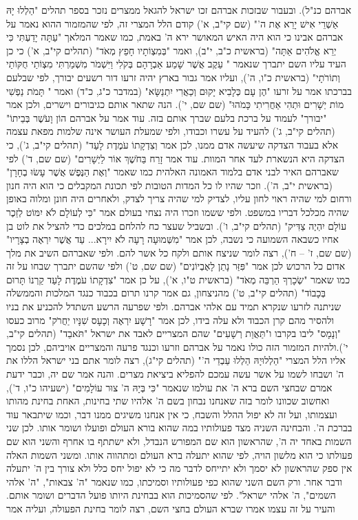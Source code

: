 \documentclass[12pt, openany]{book}
\begin{document}
אברהם כנ"ל). ובעבור שבזכות אברהם זכו ישראל להגאל ממצרים נזכר בספר תהלים "הַלְלוּ יָהּ אַשְׁרֵי אִישׁ יָרֵא אֶת ה'" (שם קי"ב, א') קודם הלל המצרי זה, לפי שהמזמור ההוא נאמר על אברהם אבינו כי הוא היה האיש המאושר ירא ה' באמת, כמו שאמר המלאך "עַתָּה יָדַעְתִּי כִּי יְרֵא אֱלֹהִים אַתָּה" (בראשית כ"ב, י"ב), ואמר "בְּמִצְו‍ֹתָיו חָפֵץ מְאֹד" (תהלים קי"ב, א') כי כן העיד עליו השם יתברך שנאמר " עֵקֶב אֲשֶׁר שָׁמַע אַבְרָהָם בְּקֹלִי וַיִּשְׁמֹר מִשְׁמַרְתִּי מִצְו‍ֹתַי חֻקּוֹתַי וְתוֹרֹתָי" (בראשית כ"ו, ה'), ועליו אמר גבור בארץ יהיה זרעו דור רשעים יבורך, לפי שבלעם בברכתו אמר על זרעו "הֶן עָם כְּלָבִיא יָקוּם וְכַאֲרִי יִתְנַשָּׂא" (במדבר כ"ג, כ"ד) ואמר " תָּמֹת נַפְשִׁי מוֹת יְשָׁרִים וּתְהִי אַחֲרִיתִי כָּמֹהוּ" (שם שם, י'). הנה שתאר אותם כגיבורים וישרים, ולכן אמר "יבורך" לעמוד על ברכת בלעם שברך אותם בזה. עוד אמר על אברהם  הוֹן וָעֹשֶׁר בְּבֵיתוֹ" (תהלים קי"ב, ג') להעיד על עשרו וכבודו, ולפי שמעלת העושר אינה שלמות מפאת עצמה אלא בעבוד הצדקה שיעשה אדם ממנו, לכן אמר  וְצִדְקָתוֹ עֹמֶדֶת לָעַד" (תהלים קי"ב, ג'), כי הצדקה היא הנשארת לעד אחר המוות. עוד אמר זָרַח בַּחֹשֶׁךְ אוֹר לַיְשָׁרִים" (שם שם, ד') לפי שאברהם האיר לבני אדם בלמוד האמונה האלהית כמו שאמר "וְאֶת הַנֶּפֶשׁ אֲשֶׁר עָשׂוּ בְחָרָן" (בראשית י"ב, ה'). וזכר שהיו לו כל המדות הטובות לפי תכונת המקבלים כי הוא היה חנון ורחום למי שהיה ראוי לחון עליו, לצדיק למי שהיה צריך לצדק, ולאחרים היה חונן ומלוה באופן שהיה מכלכל דבריו במשפט. ולפי ששמו וזכרו היה נצחי בעולם אמר "כִּי לְעוֹלָם לֹא יִמּוֹט לְזֵכֶר עוֹלָם יִהְיֶה צַדִּיק" (תהלים קי"ב, ו'). ובשביל שעצר כח להלחם במלכים כדי להציל את לוט בן אחיו כשבאה השמועה כי נשבה, לכן אמר "מִשְּׁמוּעָה רָעָה לֹא יִירָא... עַד אֲשֶׁר יִרְאֶה בְצָרָיו" (שם שם, ז' – ח'), רצה לומר שניצח אותם ולקח כל אשר להם. ולפי שאברהם השיב את מלך אדום כל הרכוש לכן אמר "פִּזַּר נָתַן לָאֶבְיוֹנִים" (שם שם, ט') ולפי שהשם יתברך שבחו על זה כמו שאמר "שְׂכָרְךָ הַרְבֵּה מְאֹד" (בראשית ט"ו, א'), על כן אמר "צִדְקָתוֹ עֹמֶדֶת לָעַד קַרְנוֹ תָּרוּם בְּכָבוֹד" (תהלים קי"ב, ט') מהניצחון, גם אמר קרנו תרום בכבוד כנגד המלכות והממשלה שניתנה לזרעו שנקרא תמיד עם אלהי אברהם. ולפי שפרעה הרשע השתדל להכניע את בניו ולהסיר מהם קרן הכבוד ולא עלה בידו, לכן אמר "רָשָׁע יִרְאֶה וְכָעָס שִׁנָּיו יַחֲרֹק" מרוב כעסו "וְנָמָס" ליבו בקרבו ו"תַּאֲוַת רְשָׁעִים" שהם המצריים לאבד את ישראל "תֹּאבֵד" (תהלים קי"ב, י').ולהיות המזמור הזה כולו נאמר על אברהם וזרעו וכנגד פרעה והמצריים אויביהם, לכן נסמך אליו הלל המצרי "הַלְלוּיָהּ הַלְלוּ עַבְדֵי ה'" (תהלים קי"ג), רצה לומר אתם בני ישראל הללו את ה' ושבחו לשמו על אשר עשה עמכם להפליא ביציאת מצרים. והנה אמר שם יה, וכבר ידעת אמרם שבחצי השם ברא ה' את עולמו שנאמר "כִּי בְּיָהּ ה' צוּר עוֹלָמִים" (ישעיהו כ"ו, ד'), ואחשוב שכוונו לומר בזה שאנחנו נבחון בשם ה' אלהיו שתי בחינות, האחת בחינת מהותו ועצמותו, ועל זה לא יפול ההלל והשבח, כי אין אנחנו משיגים ממנו דבר, וכמו שיתבאר עוד בברכת ה'. והבחינה השניה מצד פעולותיו במה שהוא בורא העולם ופועלו ושומר אותו. לכן שני השמות באחד יה ה', שהראשון הוא שם המפורש הנבדל, ולא ישתתף בו אחרף והשני הוא שם פעולתו כי הוא מלשון הויה, לפי שהוא יתעלה ברא העולם ומתהווה אותו. ומשני השמות האלה אין ספק שהראשון לא יסמך ולא יתייחס לדבר מה כי לא יפול יחס כלל ולא צורך בין ה' יתעלה ודבר אחר. ורק השם השני שהוא כפי פעולותיו וסמיכתו, כמו שנאמר "ה' צבאות", "ה' אלהי השמים", ה' אלהי ישראל". לפי שהסמיכות הוא בבחינת היותו פועל הדברים ושומר אותם. והעיר על זה עצמו אמרו שברא העולם בחצי השם, רצה לומר בחינת הפעולה, ועליה אמר 
\end{document}

